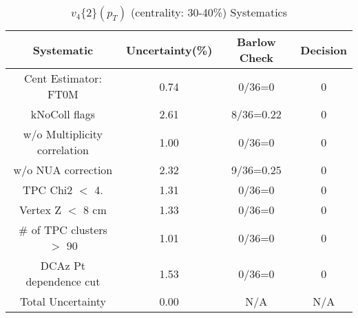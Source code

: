 \begin{table}[htbp]
\caption{$v_4\{2\}(p_{T})$ (centrality: 30-40\%) Systematics}
\label{tab:Sys_pTDiffv4}
\centering
\begin{tabular}{|c|c|c|c|}
\hline
Systematic & Uncertainty(\%) & Barlow Check & Decision \\
\hline
Cent Estimator: FT0M & 0.74 & 0/36=0 & 0 \\
kNoColl flags & 2.61 & 8/36=0.22 & 0 \\
w/o Multiplicity correlation & 1.00 & 0/36=0 & 0 \\
w/o NUA correction & 2.32 & 9/36=0.25 & 0 \\
TPC Chi2 $<$ 4. & 1.31 & 0/36=0 & 0 \\
Vertex Z $<$ 8 cm & 1.33 & 0/36=0 & 0 \\
\# of TPC clusters $>$ 90 & 1.01 & 0/36=0 & 0 \\
DCAz Pt dependence cut & 1.53 & 0/36=0 & 0 \\
\hline
Total Uncertainty & 0.00 & N/A & N/A \\
\hline
\end{tabular}
\end{table}
